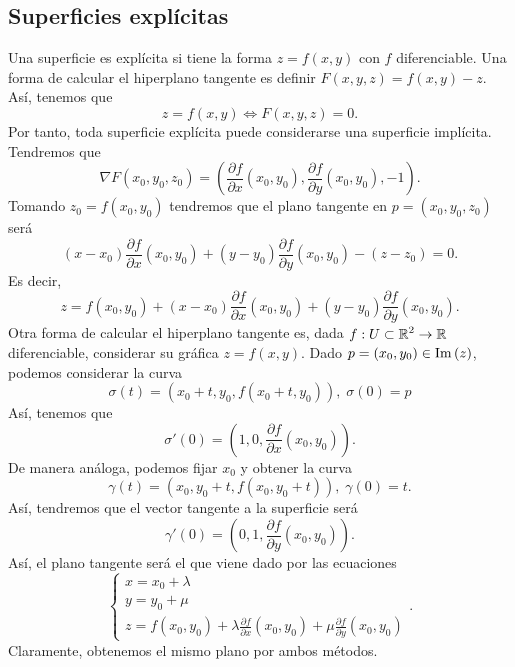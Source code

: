 \subsection*{Superficies explícitas}
Una superficie es explícita si tiene la forma $\displaystyle z = f\left(x,y\right) $ con $\displaystyle f $ diferenciable. Una forma de calcular el hiperplano tangente es definir $\displaystyle F\left(x,y,z\right)= f\left(x,y\right) -z $. Así, tenemos que
\[z = f\left(x,y\right) \iff F\left(x,y,z\right) = 0 .\]
Por tanto, toda superficie explícita puede considerarse una superficie implícita. Tendremos que
\[\nabla F\left(x_{0}, y_{0},z_{0}\right) = \left(\frac{\partial f}{\partial x}\left(x_{0}, y_{0}\right), \frac{\partial f}{\partial y}\left(x_{0}, y_{0}\right), -1\right) .\]
Tomando $\displaystyle z_{0} = f\left(x_{0}, y_{0}\right) $ tendremos que el plano tangente en $\displaystyle p=\left(x_{0}, y_{0}, z_{0}\right) $ será
\[\left(x-x_{0}\right)\frac{\partial f}{\partial x}\left(x_{0}, y_{0}\right) + \left(y - y_{0}\right)\frac{\partial f}{\partial y}\left(x_{0}, y_{0}\right) - \left(z - z_{0}\right) = 0.\]
Es decir,
\[z = f\left(x_{0}, y_{0}\right) + \left(x-x_{0}\right)\frac{\partial f}{\partial x}\left(x_{0}, y_{0}\right) + \left(y - y_{0}\right)\frac{\partial f}{\partial y}\left(x_{0}, y_{0}\right) .\]
Otra forma de calcular el hiperplano tangente es, dada $\displaystyle f : U\subset \mathbb{R}^{2} \to \mathbb{R} $ diferenciable, considerar su gráfica $\displaystyle z = f\left(x,y\right) $. Dado $\displaystyle p=\left(x_{0},y_{0}\right) \in \operatorname{Im}\left(z\right) $, podemos considerar la curva
\[\sigma\left(t\right) = \left(x_{0}+t, y_{0}, f\left(x_{0}+t,y_{0}\right)\right) , \; \sigma\left(0\right) = p\]
Así, tenemos que 
\[\sigma'\left(0\right) = \left(1,0, \frac{\partial f}{\partial x}\left(x_{0}, y_{0}\right)\right).\]
De manera análoga, podemos fijar $\displaystyle x_{0} $ y obtener la curva
\[\gamma \left(t\right)= \left(x_{0}, y_{0}+t, f\left(x_{0}, y_{0}+t\right)\right), \; \gamma\left(0\right) = t .\]
Así, tendremos que el vector tangente a la superficie será 
\[\gamma'\left(0\right) = \left(0,1,\frac{\partial f}{\partial y}\left(x_{0}, y_{0}\right)\right) .\]
Así, el plano tangente será el que viene dado por las ecuaciones
\[
\begin{cases}
x = x_{0} + \lambda \\
y = y_{0} + \mu \\
z = f\left(x_{0}, y_{0}\right) + \lambda \frac{\partial f}{\partial x}\left(x_{0}, y_{0}\right) + \mu \frac{\partial f}{\partial y}\left(x_{0}, y_{0}\right)
\end{cases}
.\]
Claramente, obtenemos el mismo plano por ambos métodos.
